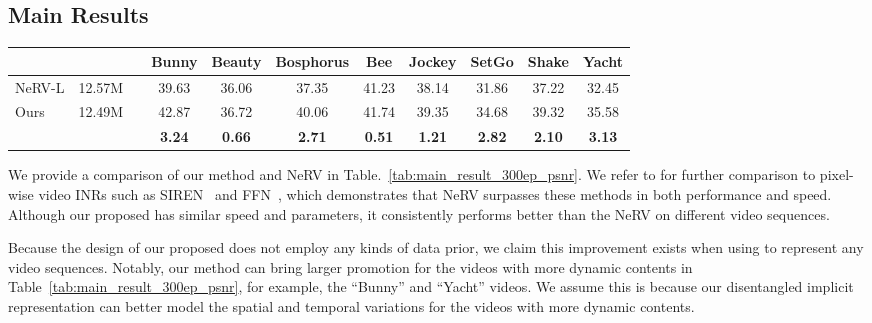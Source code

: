 \documentclass[runningheads]{llncs}
\begin{document}
\subsection{Main Results}
\begin{table*}[t]
    \centering
    \setlength{\tabcolsep}{0.7mm}
     \caption{PSNR~(larger the better) comparison between NeRV-L and our method given similar model size under the same training schedule. The last row indicates performance improvement brought by our method. Our method consistently outperforms the baseline model on diverse kinds of video sequences.}
    \begin{tabular}{llccccccccc}
    \toprule
     {} & {} & & Bunny & Beauty & Bosphorus & Bee & Jockey & SetGo & Shake & Yacht  \\
     \midrule
     NeRV-L& 12.57M & & 39.63 & 36.06 & 37.35 & 41.23 & 38.14 & 31.86 & 37.22 & 32.45 \\
     \midrule
     \multirow{2}{*}{Ours} & \multirow{2}{*}{12.49M} & & 42.87 & 36.72 & 40.06 & 41.74 & 39.35 & 34.68 & 39.32 & 35.58 \\
     \cmidrule{4-11}
     {} & {} & & \textbf{ 3.24} & \textbf{ 0.66} & \textbf{ 2.71} & \textbf{ 0.51} & \textbf{ 1.21} & \textbf{ 2.82} & \textbf{ 2.10} & \textbf{ 3.13} \\
     \bottomrule
     
\end{tabular}
    \label{tab:main_result_300ep_psnr}
\end{table*}

We provide a comparison of our method and NeRV in Table.~\ref{tab:main_result_300ep_psnr}. We refer to \cite{chen2021nerv} for further comparison to pixel-wise video INRs such as SIREN~\cite{sitzmann2020implicit} and FFN~\cite{mildenhall2020nerf}, which demonstrates that NeRV surpasses these methods in both performance and speed. Although our proposed \netname has similar speed and parameters, it consistently performs better than the NeRV on different video sequences.

Because the design of our proposed \netname does not employ any kinds of data prior, we claim this improvement exists when using \netname to represent any video sequences. Notably, our method can bring larger promotion for the videos with more dynamic contents in Table~\ref{tab:main_result_300ep_psnr}, for example, the ``Bunny'' and ``Yacht'' videos. We assume this is because our disentangled implicit representation can better model the spatial and temporal variations for the videos with more dynamic contents.
\end{document}
